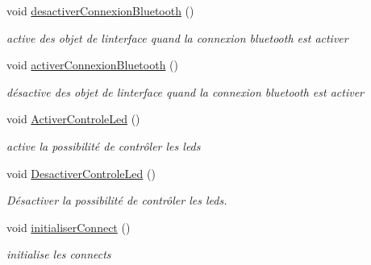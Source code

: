 \begin{DoxyCompactItemize}
void \hyperlink{class_ihm_a7ff481c3a05c7d84be2b66552fafd79e}{desactiver\+Connexion\+Bluetooth} ()
\begin{DoxyCompactList}\small\item\em active des objet de l\textquotesingle{}interface quand la connexion bluetooth est activer \end{DoxyCompactList}\item 
void \hyperlink{class_ihm_ac5d166864f1389aa44b0a6784f1977ca}{activer\+Connexion\+Bluetooth} ()
\begin{DoxyCompactList}\small\item\em désactive des objet de l\textquotesingle{}interface quand la connexion bluetooth est activer \end{DoxyCompactList}\item 
void \hyperlink{class_ihm_a4c456231c8af9eab099e9aaadf8a378b}{Activer\+Controle\+Led} ()
\begin{DoxyCompactList}\small\item\em active la possibilité de contrôler les leds \end{DoxyCompactList}\item 
void \hyperlink{class_ihm_a8315a1d902efb0434267778f8144da96}{Desactiver\+Controle\+Led} ()
\begin{DoxyCompactList}\small\item\em Désactiver la possibilité de contrôler les leds. \end{DoxyCompactList}\item 
void \hyperlink{class_ihm_a2ef778196b2eba5b0ab5cb4e066bc3b7}{initialiser\+Connect} ()
\begin{DoxyCompactList}\small\item\em initialise les connects \end{DoxyCompactList}\end{DoxyCompactItemize}

